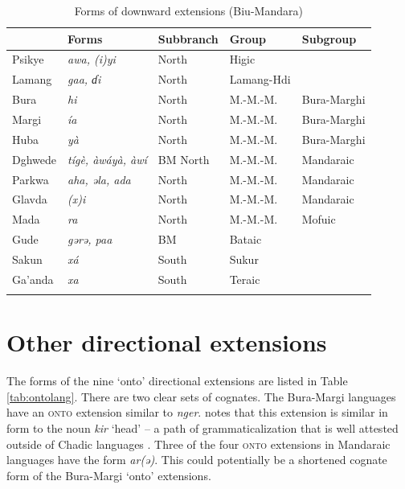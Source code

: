 \begin{table}
	\caption{Forms of downward extensions (Biu-Mandara)}
	\label{tab:downlang}
	\begin{tabular}{lllll}
		\lsptoprule
		&     Forms    &  Subbranch & Group  & Subgroup       \\
		\midrule
		Psikye	& \textit{awa, (i)yi}	&	North	&	Higic &	\\
		Lamang	& \textit{gaa, ɗi}	&	North	&	Lamang-Hdi &	\\	
		Bura	& \textit{hi}	&	North		&	M.-M.-M. & Bura-Marghi			\\
		Margi & 	\textit{ía} & 		North		&	M.-M.-M. & Bura-Marghi			\\
		Huba	& \textit{yà}	& 	North		&	M.-M.-M. & Bura-Marghi			\\
		Dghwede&	\textit{tígè, àwáyà, àwí}	& BM	North	&	M.-M.-M. & Mandaraic	\\
		Parkwa&	\textit{aha, əla, ada}	& North	&	M.-M.-M. & Mandaraic  \\
		Glavda&	\textit{(x)i}	&	North	&	M.-M.-M.	& Mandaraic \\	
		Mada 	& \textit{ra}	&	North	&	M.-M.-M. & Mofuic	\\	
		Gude&	\textit{gərə, paa}	&	BM	&	Bataic &	\\	
		Sakun&	\textit{xá} &	South	&	Sukur	& \\
		Ga'anda &	\textit{xa}	&	South & Teraic & \\
		\lspbottomrule
	\end{tabular}
\end{table}

\newpage
\section{Other directional extensions} \label{sec:diachronyother}

The forms of the nine `onto' directional extensions are listed in Table \ref{tab:ontolang}. There are two clear sets of cognates. The Bura-Margi languages have an \textsc{onto} extension similar to \textit{nger}. \citet[292]{hoffmannUntersuchungenZurStruktur1955} notes that this extension is similar in form to the noun \textit{kir} `head' -- a path of grammaticalization that is well attested outside of Chadic languages \citep[169--170]{heineWorldLexiconGrammaticalization2002}. Three of the four \textsc{onto} extensions in Mandaraic languages have the form \textit{ar(ə)}. This could potentially be a shortened cognate form of the Bura-Margi `onto' extensions.


